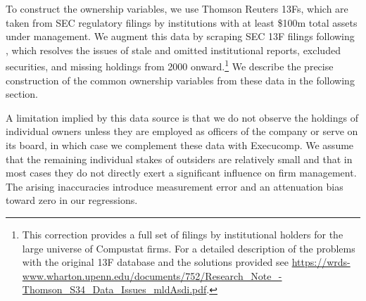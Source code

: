 \documentclass[12pt]{article}
\begin{document}
To construct the ownership variables, we use Thomson Reuters 13Fs, which are taken from SEC regulatory filings by institutions with at least \$100m total assets under management. We augment this data by scraping SEC 13F filings following \cite{ben2016granular}, which resolves the issues of stale and omitted institutional reports, excluded securities, and missing holdings from 2000 onward.\footnote{This correction provides a full set of filings by institutional holders for the large universe of Compustat firms. For a detailed description of the problems with the original 13F database and the solutions provided see \url{https://wrds-www.wharton.upenn.edu/documents/752/Research_Note_-Thomson_S34_Data_Issues_mldAsdi.pdf}.} We describe the precise construction of the common ownership variables from these data in the following section. 

A limitation implied by this data source is that we do not observe the holdings of individual owners unless they are employed as officers of the company or serve on its board, in which case we complement these data with Execucomp. We assume that the remaining individual stakes of outsiders are relatively small and that in most cases they do not directly exert a significant influence on firm management. %
The arising inaccuracies introduce measurement error and an attenuation bias toward zero in our regressions.


\end{document}
